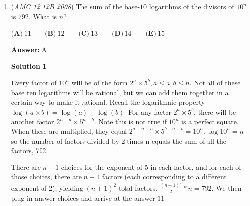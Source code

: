 \begin{enumerate}
\textbf{Solution 2 (distributions)}

This solution is pretty similar to the above. So there are 4 spots remaining, and it would be hard to count all the combinations where Auntie Em could park, but you can count all the combinations where Auntie Em can't park. Since the 12 cars are indistinguishable, we can use distributions here.

 There must be $a_1 \geq 0$ cars, then an empty spot, then $d_2 \geq 1$ cars, then an empty spot, then $d_3 \geq 1$ cars, then an empty spot, then $d_4 \geq 1$ cars, then an empty spot, then $a_5 \geq 0$ cars.

 
 \[a_1 + d_2 + d_3 + d_4 + a_5 = 12\]

 To remove all the restrictions, let $a_n = d_n - 1$.

 
 \[a_1 + a_2 + a_3 + a_4 + a_5 = 9\]

 We can now use stars and bars on these values (9 "stars", and 5 - 1 = 4 dividers), to get $\binom{13}{4}$ possibilities where she can't park. There are $\binom{16}{4}$ possibilities in total.

 
 \[\frac{\binom{13}{4}}{\binom{16}{4}} = \frac{11}{28}\]

 Subtracting that from 1 to get the probability she can park, the correct answer is $\boxed{E}$.

 


	\item (\textit{AMC 12 12B 2008}) The sum of the base-$10$ logarithms of the divisors of $10^n$ is $792$. What is $n$?


 $\textbf{(A)}\ 11\qquad \textbf{(B)}\ 12\qquad \textbf{(C)}\ 13\qquad \textbf{(D)}\ 14\qquad \textbf{(E)}\ 15$

 \textbf{Answer: }A



\textbf{Solution 1}

Every factor of $10^n$ will be of the form $2^a \times 5^b , a\leq n , b\leq n$. Not all of these base ten logarithms will be rational, but we can add them together in a certain way to make it rational. Recall the logarithmic property $\log(a \times b) = \log(a)+\log(b)$. For any factor $2^a \times 5^b$, there will be another factor $2^{n-a} \times 5^{n-b}$. Note this is not true if $10^n$ is a perfect square. When these are multiplied, they equal $2^{a+n-a} \times 5^{b+n-b} = 10^n$. $\log 10^n=n$ so the number of factors divided by 2 times n equals the sum of all the factors, 792. 

 There are $n+1$ choices for the exponent of 5 in each factor, and for each of those choices, there are $n+1$ factors (each corresponding to a different exponent of 2), yielding $(n+1)^2$ total factors. $\frac{(n+1)^2}{2}*n = 792$. We then plug in answer choices and arrive at the answer $\boxed {11}$





\end{enumerate}
